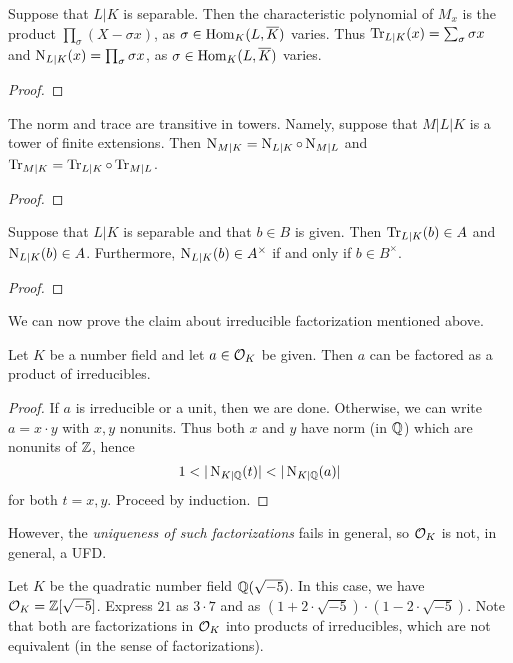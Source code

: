 \begin{proposition}\label{proposition:norm_trace_formula_embeddings}
  Suppose that $L|K$ is separable.
  Then the characteristic polynomial of $M_{x}$ is the product $\prod_{\sigma} (X - \sigma x)$, as $\sigma \in \operatorname{Hom}_{K}(L,\overline K)$ varies.
  Thus $\operatorname{Tr}_{L|K}(x) = \sum_{\sigma} \sigma x$ and $\operatorname{N}_{L|K}(x) = \prod_{\sigma} \sigma x$, as $\sigma \in \operatorname{Hom}_{K}(L,\overline K)$ varies.
\end{proposition}
\begin{proof}
\end{proof}

\begin{lemma}
  The norm and trace are transitive in towers.
  Namely, suppose that $M|L|K$ is a tower of finite extensions.
  Then $\operatorname{N}_{M|K} = \operatorname{N}_{L|K} \circ \operatorname{N}_{M|L}$ and $\operatorname{Tr}_{M|K} = \operatorname{Tr}_{L|K} \circ \operatorname{Tr}_{M|L}$.
\end{lemma}
\begin{proof}
\end{proof}

\begin{lemma}
  Suppose that $L|K$ is separable and that $b \in B$ is given.
  Then $\operatorname{Tr}_{L|K}(b) \in A$ and $\operatorname{N}_{L|K}(b) \in A$.
  Furthermore, $\operatorname{N}_{L|K}(b) \in A^{\times}$ if and only if $b \in B^{\times}$.
\end{lemma}
\begin{proof}
\end{proof}

We can now prove the claim about irreducible factorization mentioned above.
\begin{lemma}
  Let $K$ be a number field and let $a \in \mathcal{O}_{K}$ be given.
  Then $a$ can be factored as a product of irreducibles.
\end{lemma}
\begin{proof}
  If $a$ is irreducible or a unit, then we are done.
  Otherwise, we can write $a = x \cdot y$ with $x,y$ nonunits.
  Thus both $x$ and $y$ have norm (in $\mathbb{Q}$) which are nonunits of $\mathbb{Z}$, hence
  \[ 1 < |\operatorname{N}_{K|\mathbb{Q}}(t)| < |\operatorname{N}_{K|\mathbb{Q}}(a)| \]
  for both $t = x,y$.
  Proceed by induction.
\end{proof}

However, the \emph{uniqueness of such factorizations} fails in general, so $\mathcal{O}_{K}$ is not, in general, a UFD.
\begin{example}
  Let $K$ be the quadratic number field $\mathbb{Q}(\sqrt{-5})$.
  In this case, we have $\mathcal{O}_{K} = \mathbb{Z}[\sqrt{-5}]$.
  Express $21$ as $3 \cdot 7$ and as $(1 + 2 \cdot \sqrt{-5}) \cdot (1 - 2 \cdot \sqrt{-5})$.
  Note that both are factorizations in $\mathcal{O}_{K}$ into products of irreducibles, which are not equivalent (in the sense of factorizations).
\end{example}

